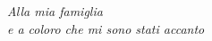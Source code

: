 
\cleardoublepage
\thispagestyle{empty}
\begin{flushright}
\itshape Alla mia famiglia\\
e a coloro che mi sono stati accanto
\end{flushright}
\cleardoublepage